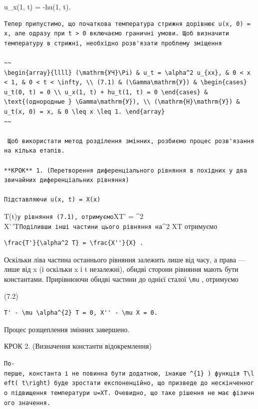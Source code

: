 \documentclass[
  ukrainian,
]{article}
\begin{document}
u\_x(1, t) = -hu(1, t).

\begin{verbatim}
Тепер припустимо, що початкова температура стрижня дорівнює u(x, 0) = x, але одразу при t > 0 включаємо граничні умови. Щоб визначити температуру в стрижні, необхідно розв'язати проблему зміщення

~~
\begin{array}{llll} (\mathrm{УЧ}\Pi) & u_t = \alpha^2 u_{xx}, & 0 < x < 1, & 0 < t < \infty, \\ (7.1) & (\Gamma\mathrm{У}) & \begin{cases} u_t(0, t) = 0 \\ u_x(1, t) + hu_t(1, t) = 0 \end{cases} & \text{(однородные } \Gamma\mathrm{У}), \\ (\mathrm{H}\mathrm{У}) & u_t(x, 0) = x, & 0 \leq x \leq 1. \end{array}
~~

 Щоб використати метод розділення змінних, розбиємо процес розв'язання на кілька етапів.

**КРОК** 1. (Перетворення диференціального рівняння в похідних у два звичайних диференціальних рівняння)

Підставляючи u(x, t) = X(x)
\end{verbatim}

T(t)\texttt{у\ рівняння\ (7.1),\ отримуємо}XT' = \alpha\^{}2
X'\,'T\texttt{Поділивши\ інші\ частини\ цього\ рівняння\ на}\alpha\^{}2
XT отримуємо

\begin{verbatim}
\frac{T'}{\alpha^2 T} = \frac{X''}{X} .
\end{verbatim}

Оскільки ліва частина останнього рівняння залежить лише від часу, а
права --- лише від x (і оскільки x і t незалежні), обидві сторони
рівняння мають бути константами. Прирівнюючи обидві частини до однієї
сталої \texttt{\textbackslash{}mu} , отримуємо

(7.2)

\begin{verbatim}
T' - \mu \alpha^{2} T = 0, X'' - \mu X = 0.
\end{verbatim}

Процес розщеплення змінних завершено.

КРОК 2. (Визначення константи відокремлення)

\texttt{По-перше,\ константа\ і\ не\ повинна\ бути\ додатною,\ інакше\ \textquotesingle{}\^{}\{1\}\textquotesingle{}\ )\ функція\ \textquotesingle{}T\textbackslash{}left(\ t\textbackslash{}right)\textquotesingle{}\ буде\ зростати\ експоненційно,\ що\ призведе\ до\ нескінченного\ підвищення\ температури\ u=XT.\ Очевидно,\ що\ таке\ рішення\ не\ має\ фізичного\ значення.}
\end{document}
